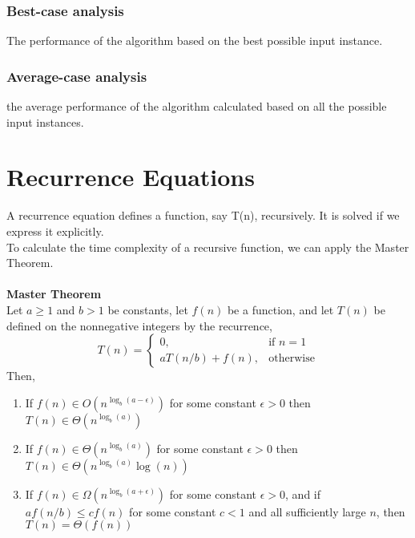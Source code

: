 \documentclass[a4paper]{article}
\begin{document}
\subsubsection{Best-case analysis}
The performance of the algorithm based on the best possible input instance.
\subsubsection{Average-case analysis}
the average performance of the algorithm calculated based on all the possible input instances.

\section{Recurrence Equations}
A recurrence equation defines a function, say T(n), recursively.
It is solved if we express it explicitly.\\
To calculate the time complexity of a recursive function, we can apply the Master Theorem.\\\\
\textbf{Master Theorem}\\
Let $a \ge 1$ and $b>1$ be constants, let $f(n)$ be a function, and let $T(n)$ be defined on the nonnegative integers by the recurrence, 
\[
	T(n)=
	\begin{cases}
		0, & \text{if } n=1\\
		aT(n/b) + f(n), & \text{otherwise}
	\end{cases}
\]
Then,
\begin{enumerate}
	\item If $f(n) \in O(n^{\log_b(a-\epsilon)})$ for some constant $\epsilon > 0$ then $T(n) \in \Theta(n^{\log_b(a)})$
	\item If $f(n) \in \Theta(n^{\log_b(a)})$ for some constant $\epsilon > 0$ then $T(n) \in \Theta(n^{\log_b(a)}\log(n))$
	\item If $f(n) \in \Omega(n^{\log_b(a+\epsilon)})$ for some constant $\epsilon > 0$, and if $af(n/b)\le cf(n)$ for some constant $c<1$ and all sufficiently large $n$, then $T(n) = \Theta(f(n))$
\end{enumerate}
\end{document}
